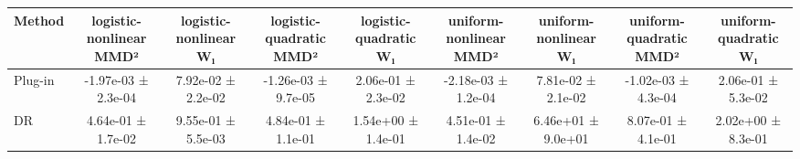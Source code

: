 \begin{tabular}{lcccccccc}
\toprule
Method & logistic-nonlinear MMD² & logistic-nonlinear W₁ & logistic-quadratic MMD² & logistic-quadratic W₁ & uniform-nonlinear MMD² & uniform-nonlinear W₁ & uniform-quadratic MMD² & uniform-quadratic W₁ \\
\midrule
Plug-in & -1.97e-03 ± 2.3e-04 & 7.92e-02 ± 2.2e-02 & -1.26e-03 ± 9.7e-05 & 2.06e-01 ± 2.3e-02 & -2.18e-03 ± 1.2e-04 & 7.81e-02 ± 2.1e-02 & -1.02e-03 ± 4.3e-04 & 2.06e-01 ± 5.3e-02 \\
DR & 4.64e-01 ± 1.7e-02 & 9.55e-01 ± 5.5e-03 & 4.84e-01 ± 1.1e-01 & 1.54e+00 ± 1.4e-01 & 4.51e-01 ± 1.4e-02 & 6.46e+01 ± 9.0e+01 & 8.07e-01 ± 4.1e-01 & 2.02e+00 ± 8.3e-01 \\
\bottomrule
\end{tabular}
